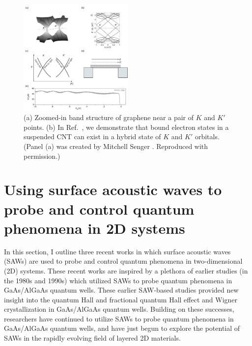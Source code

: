 \documentclass[double,12pt,1in,seploa]{beavtex}
\let\Oldsection\section
\renewcommand{\section}{\FloatBarrier\Oldsection}
\begin{document}
\begin{figure}
    \includegraphics[width = 0.5\textwidth]{CNT intro fig}
    \caption{(a) Zoomed-in band structure of graphene near a pair of $K$ and $K'$ points. (b) In Ref.\ \cite{berg_vernier_2024}, we demonstrate that bound electron states in a suspended CNT can exist in a hybrid state of $K$ and $K'$ orbitals. (Panel (a) was created by Mitchell Senger \cite{senger_optoelectronics_2021}. Reproduced with permission.)}
    \label{CNT intro fig}
\end{figure}

\section{Using surface acoustic waves to probe and control quantum phenomena in 2D systems} \label{using surface acoustic waves to probe and control quantum phenomena}

In this section, I outline three recent works in which surface acoustic waves (SAWs) are used to probe and control quantum phenomena in two-dimensional (2D) systems. These recent works are inspired by a plethora of earlier studies (in the 1980s and 1990s) which utilized SAWs to probe quantum phenomena in GaAs/AlGaAs quantum wells. These earlier SAW-based studies provided new insight into the quantum Hall and fractional quantum Hall effect \cite{wixforth_quantum_1986,esslinger_acoustoelectric_1992,esslinger_ultrasonic_1994,kukushkin_collective_2011,willett_experimental_1993} and Wigner crystallization \cite{paalanen_rf_1992} in GaAs/AlGaAs quantum wells. Building on these successes, researchers have continued to utilize SAWs to probe quantum phenomena in GaAs/AlGaAs quantum wells, and have just begun to explore the potential of SAWs in the rapidly evolving field of layered 2D materials.
\end{document}
